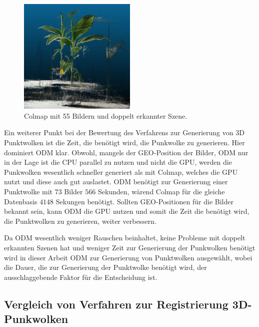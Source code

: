\documentclass[12pt,titlepage, twoside]{article}
\begin{document}
\begin{figure}
    \centering
        \includegraphics[width=0.5\textwidth]{./Images/ColmapDuplicatedScene.png}
        \caption{Colmap mit 55 Bildern und doppelt erkannter Szene.}
        \label{fig:ColmapDuplicatedScene}
\end{figure}

Ein weiterer Punkt bei der Bewertung des Verfahrens zur Generierung von 3D Punktwolken ist die Zeit, die benötigt wird, die Punkwolke zu generieren.
Hier dominiert ODM klar. 
Obwohl, mangels der GEO-Position der Bilder, ODM nur in der Lage ist die CPU parallel zu nutzen und nicht die GPU, werden die Punkwolken wesentlich schneller generiert als mit Colmap, welches die GPU nutzt und diese auch gut auslastet.
ODM benötigt zur Generierung einer Punktwolke mit $73$ Bilder $566$ Sekunden, wärend Colmap für die gleiche Datenbasis $4148$ Sekungen benötigt. 
Sollten GEO-Positionen für die Bilder bekannt sein, kann ODM die GPU nutzen und somit die Zeit die benötigt wird, die Punktwolken zu generieren, weiter verbessern.

Da ODM wesentlich weniger Rauschen beinhaltet, keine Probleme mit doppelt erkannten Szenen hat und weniger Zeit zur Generierung der Punkwolken benötigt wird in dieser Arbeit ODM zur Generierung von Punktwolken ausgewählt, 
wobei die Dauer, die zur Generierung der Punktwolke benötigt wird, der ausschlaggebende Faktor für die Entscheidung ist.

\subsection{Vergleich von Verfahren zur Registrierung 3D-Punkwolken}
\end{document}
